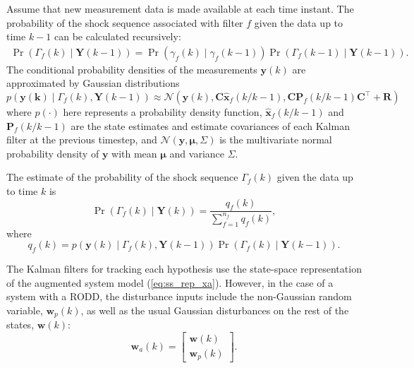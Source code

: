Assume that new measurement data is made available at each time instant. The probability of the shock sequence associated with filter $f$ given the data up to time $k-1$ can be calculated recursively:
\begin{multline} \label{eq:Pr_Gammakp1_given_Yk}
	\Pr(\Gamma_f(k) \mid \mathbf{Y}(k-1)) = 
	\Pr(\gamma_f(k) \mid \gamma_f(k-1)) \Pr(\Gamma_f(k-1) \mid \mathbf{Y}(k-1)).
\end{multline}
The conditional probability densities of the measurements $\mathbf{y}(k)$ are approximated by Gaussian distributions
\begin{equation} \label{eq:p_yk_given_Gammak_Ykm1}
	p(\mathbf{y(k)} \mid \Gamma_f(k), \mathbf{Y}(k-1)) \approx
	\mathcal{N}\left(\mathbf{y}(k), \mathbf{C} \mathbf{\hat{x}}_{f}(k/k-1), \mathbf{C} \mathbf{P}_f(k/k-1) \mathbf{C}^\intercal+\mathbf{R}\right)
\end{equation}
where $p(\cdot)$ here represents a probability density function, $\mathbf{\hat{x}}_{f}(k/k-1)$ and $\mathbf{P}_f(k/k-1)$ are the state estimates and estimate covariances of each Kalman filter at the previous timestep, and $\mathcal{N}(\mathbf{y}, \mathbf{\mu}, \Sigma)$ is the multivariate normal probability density of $\mathbf{y}$ with mean $\mathbf{\mu}$ and variance $\Sigma$.

The estimate of the probability of the shock sequence $\Gamma_f(k)$ given the data up to time $k$ is
\begin{equation} \label{eq:Pr_Gammak_given_Yk}
	\Pr(\Gamma_f(k) \mid \mathbf{Y}(k)) = \frac{q_f(k)}{\sum_{f=1}^{n_f} q_f(k)},
\end{equation}
where
\begin{equation} \label{eq:qfk}
	q_f(k) = p(\mathbf{y}(k) \mid \Gamma_f(k), \mathbf{Y}(k-1)) \Pr(\Gamma_f(k) \mid \mathbf{Y}(k-1)).
\end{equation}

The Kalman filters for tracking each hypothesis use the state-space representation of the augmented system model (\ref{eq:ss_rep_xa}). 
However, in the case of a system with a RODD, the disturbance inputs include the non-Gaussian random variable, $\mathbf{w}_p(k)$, as well as the usual Gaussian disturbances on the rest of the states, $\mathbf{w}(k)$:
\begin{equation} \label{eq:wak}
	\mathbf{w}_a(k) = \begin{bmatrix}
		\mathbf{w}(k) \\
		\mathbf{w}_p(k)
	\end{bmatrix}.
\end{equation}

